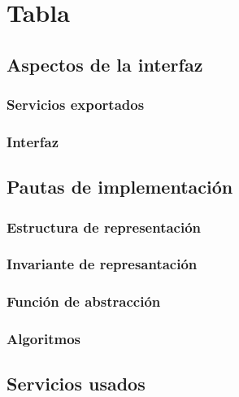 \section{Tabla}

\subsection{Aspectos de la interfaz}

\subsubsection{Servicios exportados}

\subsubsection{Interfaz}

\subsection{Pautas de implementación}

\subsubsection{Estructura de representación}

\subsubsection{Invariante de represantación}

\subsubsection{Función de abstracción}

\subsubsection{Algoritmos}

\subsection{Servicios usados}

